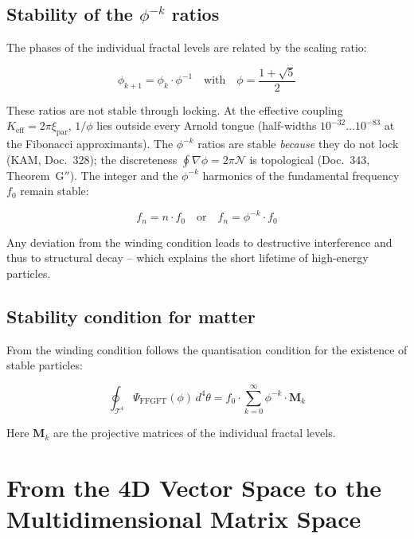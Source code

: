 	\subsection{Stability of the $\phi^{-k}$ ratios}
	\label{sec:186_stabil}
	
	The phases of the individual fractal levels are related by the scaling ratio:
	
	\begin{equation}
		\phi_{k+1} = \phi_k \cdot \phi^{-1} \quad \text{with} \quad \phi = \frac{1+\sqrt{5}}{2}
	\end{equation}
	
	These ratios are not stable through locking. At the effective coupling $K_\mathrm{eff} = 2\pi\xi_{\text{par}}$, $1/\phi$ lies outside every Arnold tongue (half-widths $10^{-32}\ldots10^{-83}$ at the Fibonacci approximants). The $\phi^{-k}$ ratios are stable \emph{because} they do not lock (KAM, Doc.~328); the discreteness $\oint\nabla\phi = 2\pi\mathcal{N}$ is topological (Doc.~343, Theorem~G$''$). The integer and the $\phi^{-k}$ harmonics of the fundamental frequency $f_0$ remain stable:
	
	\begin{equation}
		f_n = n \cdot f_0 \quad \text{or} \quad f_n = \phi^{-k} \cdot f_0
	\end{equation}
	
	Any deviation from the winding condition leads to destructive interference and thus to structural decay -- which explains the short lifetime of high-energy particles.
	
	\subsection{Stability condition for matter}
	
	From the winding condition follows the quantisation condition for the existence of stable particles:
	
	\begin{equation}
		\oint_{\mathcal{T}^4} \Psi_{\text{FFGFT}}(\phi) \, d^4\theta = f_0 \cdot \sum_{k=0}^{\infty} \phi^{-k} \cdot \mathbf{M}_k
	\end{equation}
	
	Here $\mathbf{M}_k$ are the projective matrices of the individual fractal levels.
	
	\section{From the 4D Vector Space to the Multidimensional Matrix Space}
	
